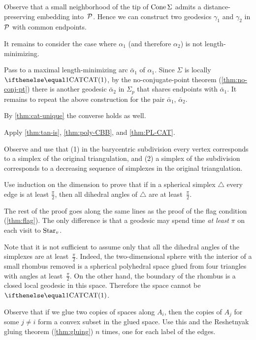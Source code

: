Observe that a small neighborhood of the tip of $\mathop{\rm Cone}\nolimits\Sigma$ admits a distance-preserving embedding into~$\mathcal{P}$.
Hence we can construct two geodesics $\gamma_1$ and $\gamma_2$ in $\mathcal{P}$ with common endpoints.

It remains to consider the case where $\alpha_1$ (and therefore $\alpha_2$) is not length-minimizing.

Pass to a maximal length-minimizing arc $\bar\alpha_1$ of $\alpha_1$.
Since $\Sigma$ is locally $\CAT1$, by the no-conjugate-point theorem (\ref{thm:no-conj-pt}) 
there is another geodesic $\bar\alpha_2$ in $\Sigma_p$ that shares endpoints with $\bar\alpha_1$.
It remains to repeat the above construction for the pair $\bar\alpha_1$, $\bar\alpha_2$.

By \ref{thm:cat-unique} the converse holds as well.

 Apply \ref{thm:tan-is}, \ref{thm:poly-CBB}, and \ref{thm:PL-CAT}.

Observe and use that (1) in the barycentric subdivision every vertex corresponds to a simplex of the original triangulation,
and (2) a simplex of the subdivision corresponds to a decreasing sequence of simplexes in the original triangulation. 

Use induction on the dimension  to prove that if in a spherical simplex $\triangle$ every edge is at least $\tfrac\pi2$, then 
all dihedral angles of $\triangle$ are at least~$\tfrac\pi2$.

The rest of the proof goes along the same lines as the proof of the flag condition (\ref{thm:flag}).
The only difference is that a geodesic may spend time {}\emph{at least} $\pi$ on each visit to $\mathop{\rm Star}\nolimits_v$.

Note that it is not sufficient to assume only that all the dihedral angles of the simplexes are at least~$\tfrac\pi2$. 
Indeed, the two-dimensional sphere with the interior of a small rhombus removed is a spherical polyhedral space glued from four triangles with angles at least~$\tfrac\pi2$.
On the other hand, the boundary of the rhombus is a closed local geodesic in this space.
Therefore the space cannot be $\CAT1$.

Observe that if we glue two copies of spaces along $A_i$, then the copies of $A_j$ for some $j\ne i$ form a convex subset in the glued space.
Use this and the Reshetnyak gluing theorem (\ref{thm:gluing}) $n$ times, one for each label of the edges.

